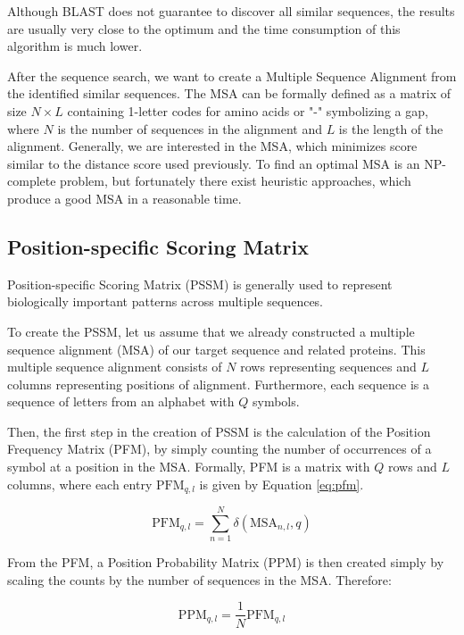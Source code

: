 Although BLAST does not guarantee to discover all similar sequences, the results are usually very close to the optimum and the time consumption of this algorithm is much lower.

After the sequence search, we want to create a Multiple Sequence Alignment from the identified similar sequences.
The MSA can be formally defined as a matrix of size $N \times L$ containing 1-letter codes for amino acids or "-" symbolizing a gap, where $N$ is the number of sequences in the alignment and $L$ is the length of the alignment.
Generally, we are interested in the MSA, which minimizes score similar to the distance score used previously.
To find an optimal MSA is an NP-complete problem, but fortunately there exist heuristic approaches, which produce a good MSA in a reasonable time. 

\subsection{Position-specific Scoring Matrix}

Position-specific Scoring Matrix (PSSM) is generally used to represent biologically important patterns across multiple sequences. 

To create the PSSM, let us assume that we already constructed a multiple sequence alignment (MSA) of our target sequence and related proteins.
This multiple sequence alignment consists of $N$ rows representing sequences and $L$ columns representing positions of alignment.
Furthermore, each sequence is a sequence of letters from an alphabet with $Q$ symbols.

Then, the first step in the creation of PSSM is the calculation of the Position Frequency Matrix (PFM), by simply counting the number of occurrences of a symbol at a position in the MSA.
Formally, PFM is a matrix with $Q$ rows and $L$ columns, where each entry $\text{PFM}_{q, l}$ is given by Equation \ref{eq:pfm}.

\begin{equation}
    \text{PFM}_{q, l} = \sum_{n = 1}^{N} \delta(\text{MSA}_{n, l}, q)
    \label{eq:pfm}
\end{equation}

From the PFM, a Position Probability Matrix (PPM) is then created simply by scaling the counts by the number of sequences in the MSA.
Therefore:

\begin{equation}
    \text{PPM}_{q, l} = \frac{1}{N} \text{PFM}_{q, l}
\end{equation}

